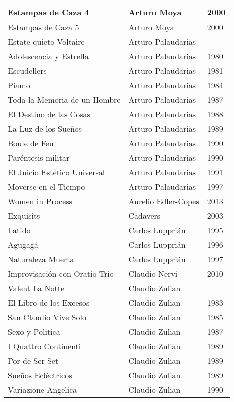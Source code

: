 \begin{center}
\begin{longtable}{ p{}  p{}  p{} }
Estampas de Caza 4 & Arturo Moya & 2000 \\ \midrule 
Estampas de Caza 5 & Arturo Moya & 2000 \\ \midrule 
Estate quieto Voltaire & Arturo Palaudarias &  \\ \midrule 
Adolescencia y Estrella & Arturo Palaudarias & 1980 \\ \midrule 
Escudellers & Arturo Palaudarias & 1981 \\ \midrule 
Piamo & Arturo Palaudarias & 1984 \\ \midrule 
Toda la Memoria de un Hombre & Arturo Palaudarias & 1987 \\ \midrule 
El Destino de las Cosas & Arturo Palaudarias & 1988 \\ \midrule 
La Luz de los Sueños & Arturo Palaudarias & 1989 \\ \midrule 
Boule de Feu & Arturo Palaudarias & 1990 \\ \midrule 
Paréntesis militar & Arturo Palaudarias & 1990 \\ \midrule 
El Juicio Estético Universal & Arturo Palaudarias & 1991 \\ \midrule 
Moverse en el Tiempo & Arturo Palaudarias & 1997 \\ \midrule 
Women in Process & Aurelio Edler-Copes & 2013 \\ \midrule 
Exquisits & Cadavers & 2003 \\ \midrule 
Latido & Carlos Lupprián & 1995 \\ \midrule 
Agugagá & Carlos Lupprián & 1996 \\ \midrule 
Naturaleza Muerta & Carlos Lupprián & 1997 \\ \midrule 
Improvisación con Oratio Trio & Claudio Nervi & 2010 \\ \midrule 
Valent La Notte & Claudio Zulian &  \\ \midrule 
El Libro de los Excesos & Claudio Zulian & 1983 \\ \midrule 
San Claudio Vive Solo & Claudio Zulian & 1985 \\ \midrule 
Sexo y Politica & Claudio Zulian & 1987 \\ \midrule 
I Quattro Continenti & Claudio Zulian & 1989 \\ \midrule 
Por de Ser Set & Claudio Zulian & 1989 \\ \midrule 
Sueños Ecléctricos & Claudio Zulian & 1989 \\ \midrule 
Variazione Angelica & Claudio Zulian & 1990 \\ \midrule 

\end{longtable}
\end{center}
